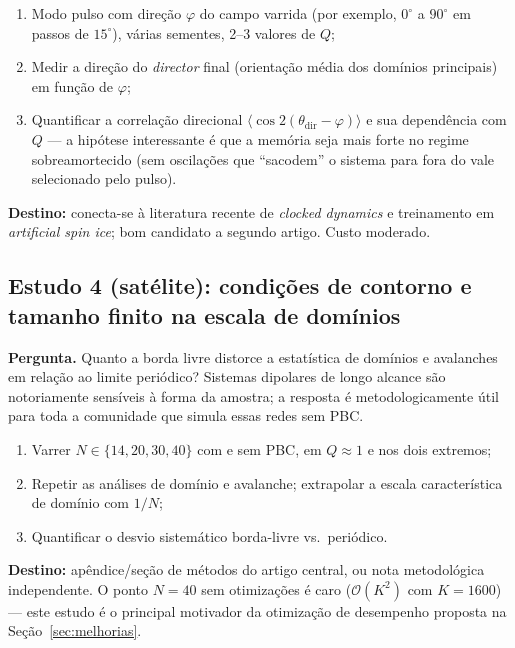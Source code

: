 \documentclass[11pt,a4paper]{article}
\begin{document}
\begin{enumerate}
\item Modo pulso com direção $\varphi$ do campo varrida (por exemplo,
$0^\circ$ a $90^\circ$ em passos de $15^\circ$), várias sementes,
2--3 valores de $Q$;
\item Medir a direção do \emph{director} final (orientação média dos
domínios principais) em função de $\varphi$;
\item Quantificar a correlação direcional
$\langle \cos 2(\theta_{\mathrm{dir}} - \varphi) \rangle$ e sua
dependência com $Q$ --- a hipótese interessante é que a memória seja
mais forte no regime sobreamortecido (sem oscilações que ``sacodem'' o
sistema para fora do vale selecionado pelo pulso).
\end{enumerate}

\textbf{Destino:} conecta-se à literatura recente de \emph{clocked
dynamics} e treinamento em \emph{artificial spin ice}; bom candidato a
segundo artigo. Custo moderado.

\subsection{Estudo 4 (satélite): condições de contorno e tamanho finito
na escala de domínios}

\textbf{Pergunta.} Quanto a borda livre distorce a estatística de
domínios e avalanches em relação ao limite periódico? Sistemas dipolares
de longo alcance são notoriamente sensíveis à forma da amostra; a
resposta é metodologicamente útil para toda a comunidade que simula
essas redes sem PBC.

\begin{enumerate}
\item Varrer $N \in \{14, 20, 30, 40\}$ com e sem PBC, em $Q \approx 1$
e nos dois extremos;
\item Repetir as análises de domínio e avalanche; extrapolar a escala
característica de domínio com $1/N$;
\item Quantificar o desvio sistemático borda-livre vs.\ periódico.
\end{enumerate}

\textbf{Destino:} apêndice/seção de métodos do artigo central, ou nota
metodológica independente. O ponto $N = 40$ sem otimizações é caro
($\mathcal{O}(K^2)$ com $K = 1600$) --- este estudo é o principal
motivador da otimização de desempenho proposta na
Seção~\ref{sec:melhorias}.

\end{document}
